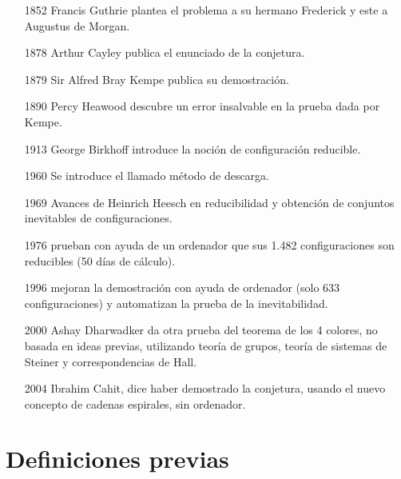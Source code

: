 \documentclass[
	3p,
	times,
	a4paper,
	authoryear
]{elsarticle}%
\begin{document}
\begin{enumerate}
	
	\item[{\color{DarkBlue}1852}] Francis Guthrie plantea el problema a su hermano Frederick y este a Augustus de Morgan.
	
	\item[{\color{DarkBlue}1878}] Arthur Cayley publica el enunciado de la conjetura.
	
	\item[{\color{DarkBlue}1879}] Sir Alfred Bray Kempe publica su demostración.
	
	\item[{\color{DarkBlue}1890}] Percy Heawood descubre un error insalvable en la prueba dada por Kempe.
	
	\item[{\color{DarkBlue}1913}] George Birkhoff introduce la noción de configuración reducible.
	
	\item[{\color{DarkBlue}1960}] Se introduce el llamado método de descarga.
	
	\item[{\color{DarkBlue}1969}] Avances de Heinrich Heesch en reducibilidad y obtención de conjuntos inevitables de configuraciones.
	
	\item[{\color{DarkBlue}1976}] \citeauthor{appel} prueban con ayuda de un ordenador que sus 1.482 configuraciones son reducibles (50 días de cálculo).
	
	\item[{\color{DarkBlue}1996}] \citeauthor{robertson} mejoran la demostración con ayuda de ordenador (solo 633 configuraciones) y automatizan la prueba de la inevitabilidad.
	
	\item[{\color{DarkBlue}2000}] Ashay Dharwadker da otra prueba del teorema de los 4 colores, no basada en ideas previas, utilizando teoría de grupos, teoría de sistemas de Steiner y correspondencias de Hall.
	
	\item[{\color{DarkBlue}2004}] Ibrahim Cahit, dice haber demostrado la conjetura, usando el nuevo concepto de cadenas espirales, sin ordenador.

\end{enumerate}

\section{Definiciones previas}\label{sec:2}
\end{document}
